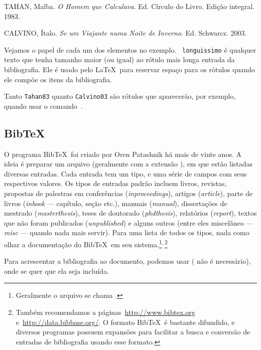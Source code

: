 \begin{thebibliography}{longuissimo}
 TAHAN, Malba. \emph{O Homem que
Calculava}. Ed. Círculo do Livro. Edição integral. 1983.

 CALVINO, Ítalo. 
\emph{Se um Viajante numa Noite de Inverno}. Ed. Schwarcz. 2003.
\end{thebibliography}

Vejamos o papel de cada um dos elementos no exemplo. {\tt
  longuissimo} é qualquer texto que tenha tamanho maior (ou igual) ao
rótulo mais longa entrada da bibliografia. Ele é usado pelo
\LaTeX\ para reservar espaço para os rótulos quando ele compõe os
itens da bibliografia.

Tanto {\tt Tahan83} quanto {\tt Calvino03} são rótulos que aparecerão,
por exemplo, quando usar o comando~.

\subsection{Bib\TeX}

O programa Bib\TeX\ foi criado por Oren Patashnik há mais de vinte
anos. A ideia é preparar um arquivo (geralmente com a extensão
), em que estão listadas diversas entradas. Cada entrada
tem um tipo, e uma série de campos com seus respectivos valores. Os
tipos de entradas padrão incluem livros, revistas, propostas de
palestras em conferências (\emph{inproceedings}), artigos
(\emph{article}), parte de livros (\emph{inbook} --- capítulo, seção
etc.), manuais (\emph{manual}), dissertações de mestrado
(\emph{masterthesis}), teses de doutorado (\emph{phdthesis}),
relatórios (\emph{report}), textos que não foram publicados
(\emph{unpublished}) e alguns outros (entre eles miscelâneo ---
\emph{misc} --- quando nada mais servir). Para uma lista de todos os
tipos, nada como olhar a documentação do Bib\TeX\ em seu
sistema.\negthinspace\footnote{Geralmente o arquivo se chama
  .}$^\textrm,$\thinspace\footnote{Também recomendamos
  a páginas~\url{http://www.bibtex.org}
  e~\url{http://data.bibbase.org/}. O formato Bib\TeX\ é bastante
  difundido, e diversos programas possuem expansões para facilitar a
  busca e conversão de entradas de bibliografia usando esse formato.}

Para acrescentar a bibliografia ao documento, podemos usar 
 ( não é
necessário), onde se quer que ela seja incluída. 


